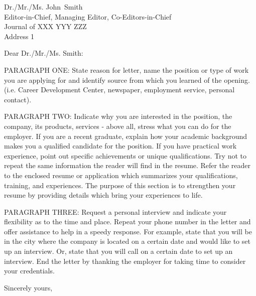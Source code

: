 \documentclass{cover-letter}
\def\EditorFirstName{John}
\def\EditorLastName{Smith}
\def\EditorName{\EditorFirstName~\EditorLastName}
\def\EditorTitle{Editor-in-Chief, Managing Editor, Co-Editors-in-Chief}
\def\JournalName{Journal of XXX YYY ZZZ} %
\def\JournalAddress{Address 1} %
\begin{document}
\date{October~21.~1999}

\begin{letter}{Dr./Mr./Ms. \EditorName \\
\EditorTitle \\
\JournalName \\
\JournalAddress}

\CoverLetterHeader

\opening{Dear Dr./Mr./Ms. \EditorLastName:} 

PARAGRAPH ONE: State reason for letter, name the position or type of work you are applying for and identify source from which you learned of the opening.
(i.e. Career Development Center, newspaper, employment service, personal contact). 

PARAGRAPH TWO: Indicate why you are interested in the position, the company, its products, services - above all, stress what you can do for the employer.
If you are a recent graduate, explain how your academic background makes you a qualified candidate for the position.
If you have practical work experience, point out specific achievements or unique qualifications.
Try not to repeat the same information the reader will find in the resume.
Refer the reader to the enclosed resume or application which summarizes your qualifications, training, and experiences.
The purpose of this section is to strengthen your resume by providing details which bring your experiences to life. 

PARAGRAPH THREE: Request a personal interview and indicate your flexibility as to the time and place.
Repeat your phone number in the letter and offer assistance to help in a speedy response.
For example, state that you will be in the city where the company is located on a certain date and would like to set up an interview.
Or, state that you will call on a certain date to set up an interview.
End the letter by thanking the employer for taking time to consider your credentials. 

\closing{Sincerely yours,} 

\end{letter}
\end{document}
